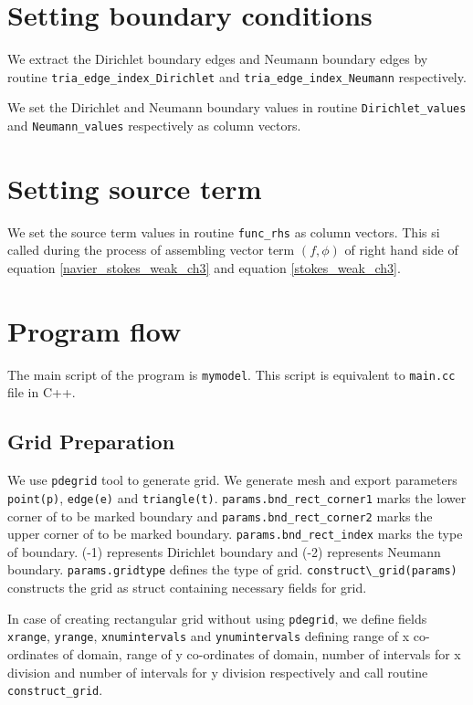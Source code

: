 \documentclass[a4paper]{book}
\begin{document}
\section{Setting boundary conditions}

We extract the Dirichlet boundary edges and Neumann boundary edges by routine \verb|tria_edge_index_Dirichlet| and \verb|tria_edge_index_Neumann| respectively.

We set the Dirichlet and Neumann boundary values in routine \verb|Dirichlet_values| and \verb|Neumann_values| respectively as column vectors. 

\section{Setting source term}

We set the source term values in routine \verb|func_rhs| as column vectors. This si called during the process of assembling vector term $(f,\phi)$ of right hand side of equation \ref{navier_stokes_weak_ch3} and equation \ref{stokes_weak_ch3}.

\section{Program flow}

The main script of the program is \verb|mymodel|. This script is equivalent to \verb|main.cc| file in C++.

\subsection{Grid Preparation}

We use \verb|pdegrid| tool to generate grid. We generate mesh and export parameters \verb|point(p)|, \verb|edge(e)| and \verb|triangle(t)|. \verb|params.bnd_rect_corner1| marks the lower corner of to be marked boundary and \verb|params.bnd_rect_corner2| marks the upper corner of to be marked boundary. \verb|params.bnd_rect_index| marks the type of boundary. (-1) represents Dirichlet boundary and (-2) represents Neumann boundary. \verb|params.gridtype| defines the type of grid. \verb|construct\_grid(params)| constructs the grid as struct containing necessary fields for grid. 

In case of creating rectangular grid without using \verb|pdegrid|, we define fields \verb|xrange|, \verb|yrange|, \verb|xnumintervals| and \verb|ynumintervals| defining range of x co-ordinates of domain, range of y co-ordinates of domain, number of intervals for x division and number of intervals for y division respectively and call routine \verb|construct_grid|.
\end{document}
